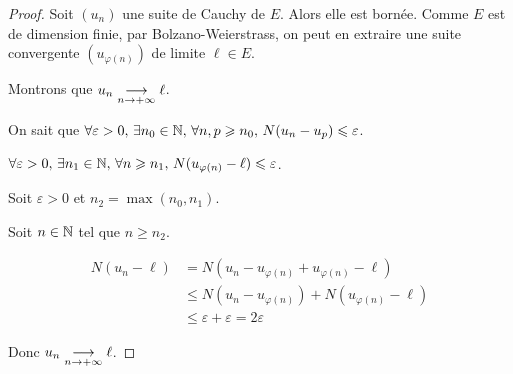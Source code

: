\begin{proof}
    Soit $(u_n)$ une suite de Cauchy de $E$. Alors elle est bornée. 
    Comme $E$ est de dimension finie, par Bolzano-Weierstrass, on peut en extraire
    une suite convergente $(u_{\varphi(n)})$ de limite $\ell \in E$.

    Montrons que $u_n \underset{n \to +\infty}{\longrightarrow} \ell$.

    On sait que $\forall \varepsilon > 0, \, \exists n_0 \in \mathbb{N}, \, \forall n, p \geqslant n_0, \, N(u_n - u_p) \leqslant \varepsilon$. 

    $\forall \varepsilon > 0, \, \exists n_1 \in \mathbb{N}, \, \forall n \geqslant n_1, \, N(u_{\varphi(n)} - \ell) \leqslant \varepsilon$.

    Soit $\varepsilon > 0$ et $n_2 = \max(n_0, n_1)$.

    Soit $n \in \mathbb{N}$ tel que $n \geqslant n_2$.

    \begin{align*}
        N(u_n - \ell) & = N(u_n - u_{\varphi(n)} + u_{\varphi(n)} - \ell) \\
        & \leqslant N(u_n - u_{\varphi(n)}) + N(u_{\varphi(n)} - \ell) \\
        & \leqslant \varepsilon + \varepsilon = 2 \varepsilon
    \end{align*}

    Donc $u_n \underset{n \to +\infty}{\longrightarrow} \ell$.
\end{proof}


